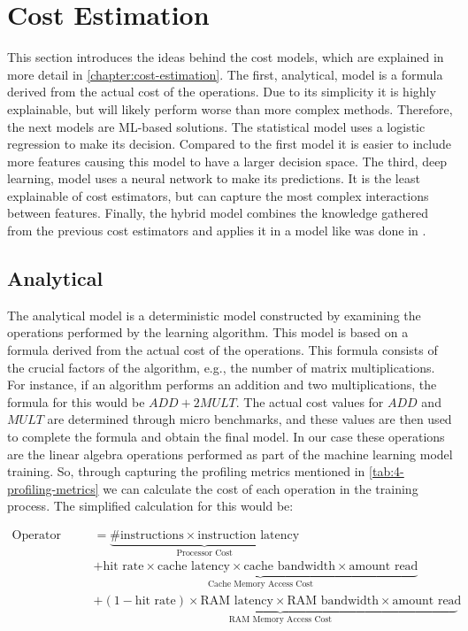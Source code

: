 \section{Cost Estimation}
\label{sec:4-cost-estimation}

This section introduces the ideas behind the cost models, which are explained in more detail in \autoref{chapter:cost-estimation}. The first, analytical, model is a formula derived from the actual cost of the operations. Due to its simplicity it is highly explainable, but will likely perform worse than more complex methods. Therefore, the next models are ML-based solutions. The statistical model uses a logistic regression to make its decision. Compared to the first model it is easier to include more features causing this model to have a larger decision space. The third, deep learning, model uses a neural network to make its predictions. It is the least explainable of cost estimators, but can capture the most complex interactions between features. Finally, the hybrid model combines the knowledge gathered from the previous cost estimators and applies it in a model like was done in \cite{halide_cost_model}.

\subsection{Analytical}
The analytical model is a deterministic model constructed by examining the operations performed by the learning algorithm. This model is based on a formula derived from the actual cost of the operations. This formula consists of the crucial factors of the algorithm, e.g., the number of matrix multiplications. For instance, if an algorithm performs an addition and two multiplications, the formula for this would be $ADD + 2MULT$. The actual cost values for $ADD$ and $MULT$ are determined through micro benchmarks, and these values are then used to complete the formula and obtain the final model. In our case these operations are the linear algebra operations performed as part of the machine learning model training. So, through capturing the profiling metrics mentioned in \autoref{tab:4-profiling-metrics} we can calculate the cost of each operation in the training process. The simplified calculation for this would be:

\vspace{-0.5cm}
\begin{align*}
    \text{{Operator cost}} & =  \underbrace{\# \text{{instructions}} \times \text{{instruction latency}}}_{\text{{Processor Cost}}}                                                         \\
                           & + \underbrace{\text{{hit rate}} \times \text{{cache latency}} \times \text{{cache bandwidth}} \times \text{{amount read}}}_{\text{{Cache Memory Access Cost}}} \\
                           & + \underbrace{(1 - \text{{hit rate}}) \times \text{{RAM latency}} \times \text{{RAM bandwidth}} \times \text{{amount read}}}_{\text{{RAM Memory Access Cost}}}
\end{align*}

